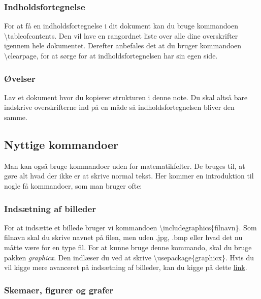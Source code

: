 \subsubsection{Indholdsfortegnelse}
For at få en indholdsfortegnelse i dit dokument kan du bruge kommandoen \textbackslash tableofcontents.
Den vil lave en rangordnet liste over alle dine overskrifter igennem hele dokumentet.
Derefter anbefales det at du bruger kommandoen \textbackslash clearpage, for at sørge for at indholdsfortegnelsen har sin egen side.

\subsubsection{Øvelser}
\begin{opg}
Lav et dokument hvor du kopierer strukturen i denne note.
Du skal altså bare indskrive overskrifterne ind på en måde så indholdsfortegnelsen bliver den samme.
\end{opg}

\subsection{Nyttige kommandoer}
Man kan også bruge kommandoer uden for matematikfelter. 
De bruges til, at gøre alt hvad der ikke er at skrive normal tekst.
Her kommer en introduktion til nogle få kommandoer, som man bruger ofte:

\subsubsection{Indsætning af billeder}
For at indsætte et billede bruger vi kommandoen \textbackslash includegraphics\{filnavn\}. 
Som filnavn skal du skrive navnet på filen, 
men uden .jpg, .bmp eller hvad det nu måtte være for en type fil.
For at kunne bruge denne kommando, skal du bruge pakken \textit{graphicx}. 
Den indlæser du ved at skrive \textbackslash usepackage\{graphicx\}. 
Hvis du vil kigge mere avanceret på indsætning af billeder, kan du kigge på dette \href{https://en.wikibooks.org/wiki/LaTeX/Importing_Graphics}{link}.

\subsubsection{Skemaer, figurer og grafer}
